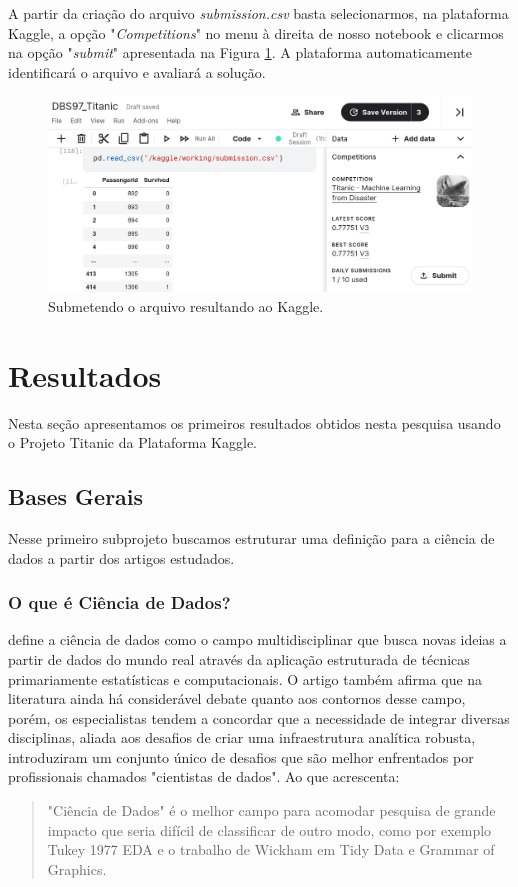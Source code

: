 \documentclass{article}
\begin{document}
A partir da criação do arquivo \emph{submission.csv} basta selecionarmos, na plataforma Kaggle, a opção "\emph{Competitions}" no menu à direita de nosso notebook e clicarmos na opção "\emph{submit}" apresentada na Figura \ref{submit}. A plataforma automaticamente identificará o arquivo e avaliará a solução. 
\begin{figure}[H]
\centering
\includegraphics[width=\textwidth]{Figures/submit.png}
\caption{Submetendo o arquivo resultando ao Kaggle.}
\label{submit}
\end{figure}

\newpage
\section{Resultados}
\label{resultados}

Nesta seção apresentamos os primeiros resultados obtidos nesta pesquisa usando o Projeto Titanic da Plataforma Kaggle.

\subsection{Bases Gerais}
Nesse primeiro subprojeto buscamos estruturar uma definição para a ciência de dados a partir dos artigos estudados. 

\subsubsection{O que é Ciência de Dados?}
\cite{BATON} define a ciência de dados como o campo multidisciplinar que busca novas ideias a partir de dados do mundo real através da aplicação estruturada de técnicas primariamente estatísticas e computacionais. 
O artigo também afirma que na literatura ainda há considerável debate quanto aos contornos desse campo, porém, os especialistas tendem a concordar que a necessidade de integrar diversas disciplinas, aliada aos desafios de criar uma infraestrutura analítica robusta, introduziram um conjunto único de desafios que são melhor enfrentados por profissionais chamados "cientistas de dados". Ao que \cite{DONOHO} acrescenta:
\begin{quote}
"Ciência de Dados" é o melhor campo para acomodar pesquisa de grande impacto que seria difícil de classificar de outro modo, como por exemplo Tukey 1977 EDA e o trabalho de Wickham em Tidy Data e Grammar of Graphics.
\end{quote}
\end{document}
